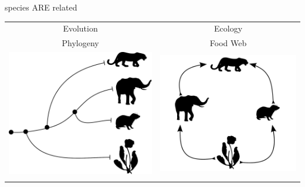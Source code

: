 \begin{frame}

{species ARE related}

\begin{longtable}[c]{@{}cc@{}}
\toprule\addlinespace
Evolution & Ecology
\\\addlinespace
\midrule\endhead
Phylogeny & Food Web
\\\addlinespace
\includegraphics{images/small_phylo.pdf} &
\includegraphics{images/small_fw.pdf}
\\\addlinespace
\bottomrule
\end{longtable}


\end{frame}
